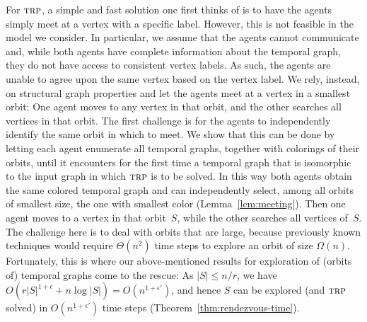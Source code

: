 \documentclass[10pt,a4paper]{article}
\newcommand{\trp}{\textsc{trp}}
\begin{document}
For $\trp$, a simple and fast solution one first thinks of is to have the agents
simply meet at a vertex with a specific label. {However}, this is not
feasible in the model we consider. In particular, we assume that the agents
cannot communicate %
and, while both agents have complete information about the
temporal graph, they do not have access to consistent vertex labels. As such,
the agents are unable to agree upon the same vertex based on the vertex label.
We rely, instead, on structural graph properties and let the agents meet at a
vertex in a smallest orbit: One agent moves to any vertex in that orbit, and the
other searches all vertices in that orbit. The first challenge is for the agents
to independently identify the same orbit in which to meet. We show that this can
be done by letting each agent enumerate all temporal graphs, together with
colorings of their orbits, until it encounters for the first time a temporal
graph that is isomorphic to the input graph in which $\trp$ is to be solved. In
this way both agents obtain the same colored temporal graph and can
independently select, among all orbits of smallest size, the one with smallest
color (Lemma~\ref{lem:meeting}).
%
Then one agent moves to a vertex in that orbit~$S$, while the other searches all
vertices of~$S$. The challenge here is to deal with orbits that are large,
because previously known techniques would require $\Theta(n^2)$ time steps to
explore an orbit of size $\Omega(n)$. {Fortunately}, this is where our
above-mentioned results for exploration of (orbits of) temporal graphs come to
the rescue: As $|S|\le n/r$, we have $O(r|S|^{1+\epsilon}+n\log
|S|)=O(n^{1+\epsilon'})$, and hence $S$ can be explored (and $\trp$ solved) in
$O(n^{1+\epsilon'})$ time steps (Theorem~\ref{thm:rendezvous-time}).
\end{document}

